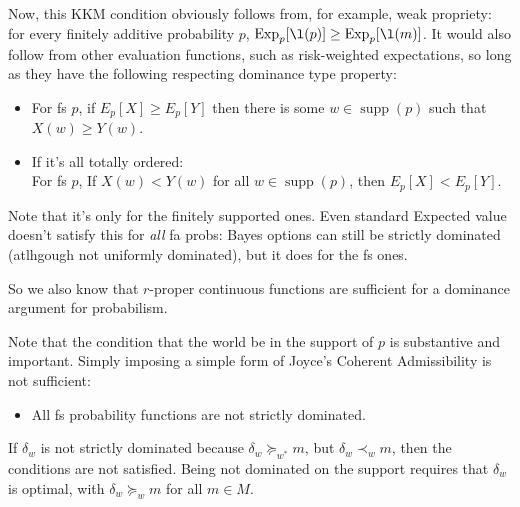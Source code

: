 \documentclass[11pt]{article}
\newtheorem{lemma}[theorem]{Lemma}
\theoremstyle{definition}
\theoremstyle{remark}
\newcommand{\R}{\mathbb R}
\newcommand{\M}{\mathcal M}
\newcommand{\Lf}{\mathfrak L}
\newcommand{\supp}{\operatorname{supp}}
\newcommand{\Exp}{\operatorname{Exp}}
\begin{document}
Now, this KKM condition obviously follows from, for example, weak propriety: for every finitely additive probability $p$, $\Exp_p[\l(p)]\geq\Exp_p[\l(m)]$. It would also follow from other evaluation functions, such as risk-weighted expectations, so long as they have the following respecting dominance type property: 
	\begin{itemize}
	\item For fs $p$, if $E_p[X]\geq E_p[Y]$ then there is some $w\in\supp(p)$ such that $X(w)\geq Y(w)$.
	\item If it's all totally ordered:\\
	For fs $p$, If $X(w)< Y(w)$ for all $w\in\supp(p)$, then $E_p[X]<E_p[Y]$. 
\end{itemize}
Note that it's only for the finitely supported ones. Even standard Expected value doesn't satisfy this for \emph{all} fa probs: Bayes options can still be strictly dominated (atlhgough not uniformly dominated), but it does for the fs ones. 

So we also know that $r$-proper continuous functions are sufficient for a dominance argument for probabilism. 


%
%	
%	
%	
%	
%	
%	

Note that the condition that the world be in the support of $p$ is substantive and important. Simply imposing a simple form of Joyce's Coherent Admissibility is not sufficient: 
\begin{itemize}
	\item All fs probability functions are not strictly dominated. 
\end{itemize}
If $\delta_w$ is not strictly dominated because $\delta_w\succeq_{w^*}m$, but $\delta_w\prec_w m$, then the conditions are not satisfied. Being not dominated on the support requires that $\delta_w$ is optimal, with $\delta_w\succeq_w m$ for all $m\in M$. 
\end{document}
